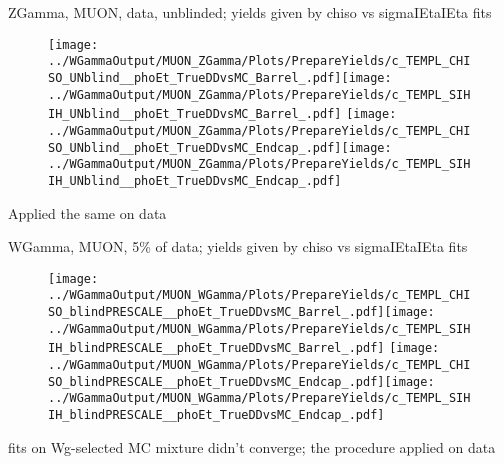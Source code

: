\documentclass{beamer}
\begin{document}
\begin{frame}{ZGamma, MUON, data, unblinded; yields given by chiso vs sigmaIEtaIEta fits}
  \begin{figure}
    \centering
    \texttt{[image: ../WGammaOutput/MUON\_ZGamma/Plots/PrepareYields/c\_TEMPL\_CHISO\_UNblind\_\_phoEt\_TrueDDvsMC\_Barrel\_.pdf]}\texttt{[image: ../WGammaOutput/MUON\_ZGamma/Plots/PrepareYields/c\_TEMPL\_SIHIH\_UNblind\_\_phoEt\_TrueDDvsMC\_Barrel\_.pdf]}
    \texttt{[image: ../WGammaOutput/MUON\_ZGamma/Plots/PrepareYields/c\_TEMPL\_CHISO\_UNblind\_\_phoEt\_TrueDDvsMC\_Endcap\_.pdf]}\texttt{[image: ../WGammaOutput/MUON\_ZGamma/Plots/PrepareYields/c\_TEMPL\_SIHIH\_UNblind\_\_phoEt\_TrueDDvsMC\_Endcap\_.pdf]}
  \end{figure}
  \scriptsize Applied the same on data
\end{frame}

\begin{frame}{WGamma, MUON, 5\% of data; yields given by chiso vs sigmaIEtaIEta fits}
  \begin{figure}
    \centering
    \texttt{[image: ../WGammaOutput/MUON\_WGamma/Plots/PrepareYields/c\_TEMPL\_CHISO\_blindPRESCALE\_\_phoEt\_TrueDDvsMC\_Barrel\_.pdf]}\texttt{[image: ../WGammaOutput/MUON\_WGamma/Plots/PrepareYields/c\_TEMPL\_SIHIH\_blindPRESCALE\_\_phoEt\_TrueDDvsMC\_Barrel\_.pdf]}
    \texttt{[image: ../WGammaOutput/MUON\_WGamma/Plots/PrepareYields/c\_TEMPL\_CHISO\_blindPRESCALE\_\_phoEt\_TrueDDvsMC\_Endcap\_.pdf]}\texttt{[image: ../WGammaOutput/MUON\_WGamma/Plots/PrepareYields/c\_TEMPL\_SIHIH\_blindPRESCALE\_\_phoEt\_TrueDDvsMC\_Endcap\_.pdf]}
  \end{figure}
  \scriptsize fits on Wg-selected MC mixture didn't converge; the procedure applied on data
\end{frame}
\end{document}
